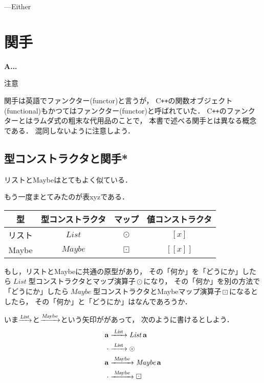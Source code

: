 \documentclass[a5paper,draft]{jsbook}
\def\[{\left[\!\left[}
\def\]{\right]\!\right]}
\newcommand{\programminglanguage}[1]{\textsf{#1}}
\newcommand{\cxx}{\programminglanguage{C}\texttt{++}}
\newenvironment{leader}{\begingroup\bf}{\endgroup}
\newenvironment{caution}{\begin{boxnote}\begin{center}注意\end{center}}{\end{boxnote}}
\newcommand{\mathTypeParameter}[1]{\mathbf{#1}}
\newcommand{\mathFunctor}[1]{\mathop{\textsl{#1}}} %
\newcommand{\mathTypeConstructor}[1]{\mathit{#1}} %
\newcommand{\mathListWith}[1]{\left[#1\right]}
\newcommand{\mathMaybeWith}[1]{\[#1\]}
\newcommand{\mathPureWith}[1]{\left\langle#1\right\rangle}
\DeclareMathOperator{\mathList}{\mathTypeConstructor{List}}
\DeclareMathOperator{\mathMaybe}{\mathTypeConstructor{Maybe}}
\newcommand{\mathBinaryOperator}[1]{\operatorname{#1}}
\newcommand{\mathGeneralMap}{\mathBinaryOperator{\cdot}}
\newcommand{\mathMap}{\mathBinaryOperator{\odot}}
\newcommand{\mathMaybeMap}{\mathBinaryOperator{\boxdot}}
\begin{document}
---Either

\chapter{関手}
\label{ch:functor}

\begin{leader}
A...
\end{leader}

\begin{caution}
関手は英語でファンクター(functor)と言うが，
\cxx の関数オブジェクト(functional)もかつてはファンクター(functor)と呼ばれていた．
\cxx のファンクターとはラムダ式の粗末な代用品のことで，
本書で述べる関手とは異なる概念である．
混同しないように注意しよう．
\end{caution}


\section{型コンストラクタと関手*}

リストとMaybeはとてもよく似ている．

もう一度まとてみたのが表xyzである．

\begin{table}
\begin{center}
\begin{tabular}{||c|c|c|c||}\hline
型&型コンストラクタ&マップ&値コンストラクタ\\\hline\hline
リスト&$\mathList$&$\mathMap$&$\mathListWith{x}$\\
Maybe&$\mathMaybe$&$\mathMaybeMap$&$\mathMaybeWith{x}$\\\hline
\end{tabular}
\end{center}
\end{table}

もし，リストとMaybeに共通の原型があり，
その「何か」を「どうにか」したら$\mathList$型コンストラクタとマップ演算子$\mathMap$になり，
その「何か」を別の方法で「どうにか」したら$\mathMaybe$型コンストラクタとMaybeマップ演算子$\mathMaybeMap$になるとしたら，
その「何か」と「どうにか」はなんであろうか．

いま$\xrightarrow{\mathFunctor{List}}$と$\xrightarrow{\mathFunctor{Maybe}}$という矢印ががあって，
次のように書けるとしよう．
\begin{align}
\mathTypeParameter{a}&\xrightarrow{\;\mathFunctor{List}\;}\mathList\mathTypeParameter{a}\\
\mathGeneralMap&\xrightarrow{\;\mathFunctor{List}\;}\mathMap\\
\mathTypeParameter{a}&\xrightarrow{\;\mathFunctor{Maybe}\;}\mathMaybe\mathTypeParameter{a}\\
\mathGeneralMap&\xrightarrow{\;\mathFunctor{Maybe}\;}\mathMaybeMap
\end{align}
\end{document}

